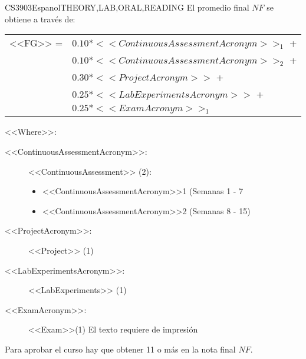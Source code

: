  
  \begin{evaluation}{CS3903}{Espanol}{THEORY,LAB,ORAL,READING}
  El promedio final $NF$ se obtiene a través de:
 
  \begin{tabular}{cl}
      <<FG>> = & $0.10*<<ContinuousAssessmentAcronym>>_{1}$ +\\
               & $0.10*<<ContinuousAssessmentAcronym>>_{2}$ +\\
               & $0.30*<<ProjectAcronym>>$ + \\
               & $0.25*<<LabExperimentsAcronym>>$ + \\
               & $0.25*<<ExamAcronym>>_{1}$
  \end{tabular}
 
  \noindent <<Where>>:
  \begin{description}
  \item[<<ContinuousAssessmentAcronym>>:] <<ContinuousAssessment>> (2):
       \begin{itemize}
             \item  <<ContinuousAssessmentAcronym>>1 (Semanas 1 - 7
              \item <<ContinuousAssessmentAcronym>>2 (Semanas 8 - 15) 
       \end{itemize}
   \item[<<ProjectAcronym>>:]  <<Project>> (1)
   \item[<<LabExperimentsAcronym>>:] <<LabExperiments>> (1)
   \item[<<ExamAcronym>>:] <<Exam>>(1) El texto requiere de impresión
  \end{description}
  \noindent Para aprobar el curso hay que obtener 11 o más en la nota final $NF$.
  \end{evaluation}
 
